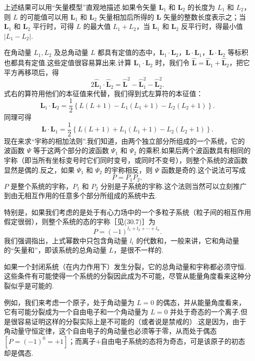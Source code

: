 上述结果可以用“矢量模型”直观地描述.如果令矢量 $\boldsymbol{L}_1$ 和 $\boldsymbol{L}_2$ 的长度为 $L_1$ 和 $L_2$，则 $L$ 的可能值可以用 $\boldsymbol{L}_1$ 和 $\boldsymbol{L}_2$ 矢量相加后所得的 $\boldsymbol{L}$ 矢量的整数长度表示之；当 $\boldsymbol{L}_1$ 和 $\boldsymbol{L}_2$ 平行时，可得 $L$ 的最大值 $L_1+L_2$，当 $\boldsymbol{L}_1$ 和 $\boldsymbol{L}_2$ 反平行时，得最小值 $|L_1-L_2|$.

在角动量 $L_1,L_2$ 及总角动量 $L$ 都具有定值的态中，$\boldsymbol{L}_1\cdot\boldsymbol{L}_2$，$\boldsymbol{L}\cdot\boldsymbol{L}_1$，$\boldsymbol{L}\cdot\boldsymbol{L}_2$ 等标积也都具有定值.这些定值很容易算出来.计算 $\boldsymbol{L}_1\cdot\boldsymbol{L}_2$ 时，我们令 $\hat{\boldsymbol{L}}=\hat{\boldsymbol{L}}_1+\hat{\boldsymbol{L}}_2$，把它平方再移项后，得
\begin{equation*}
  2\hat{\boldsymbol{L}}_1\cdot\hat{\boldsymbol{L}}_2
  =\hat{\boldsymbol{L}}^2-\hat{\boldsymbol{L}}_1^2-\hat{\boldsymbol{L}}_2^2.
\end{equation*}
式右的算符用他们的本征值来代替，我们得到式左算符的本征值：
\begin{equation}
  \boldsymbol{L}_1\cdot\boldsymbol{L}_2
  =\frac{1}{2}\left\{L(L+1)-L_1(L_1+1)-L_2(L_2+1)\right\}.
\end{equation}
同理可得
\begin{equation}
  \boldsymbol{L}\cdot\boldsymbol{L}_1
  =\frac{1}{2}\left\{L(L+1)+L_1(L_1+1)-L_2(L_2+1)\right\}.
\end{equation}
现在来求“宇称的相加法则”.我们知道，由两个独立部分所组成的一个系统，它的波函数 $\varPsi$ 等于这两个部分的波函数 $\varPsi_1$ 和 $\varPsi_2$ 的乘积.如果后两个波函数具有相同的宇称（即当所有坐标变号时它们同时变号，或同时不变号），则整个系统的波函数显然是偶的.反之，如果 $\varPsi_1$ 和 $\varPsi_2$ 的宇称相反，则 $\varPsi$ 函数是奇的.这个说法可写成
\begin{equation}
  P=P_1P_2,
\end{equation}
$P$ 是整个系统的宇称，$P_1$ 和 $P_2$ 分别是子系统的宇称.这个法则当然可以立刻推广到由无相互作用的任意多个部分所组成的系统中去.

特别是，如果我们考虑的是处于有心力场中的一个多粒子系统（粒子间的相互作用假定很弱），则整个系统的态的宇称［见(30.7)］为
\begin{equation}
  P=(-1)^{l_1+l_2+\cdots+l_n}.
\end{equation}
我们强调指出，上式幂数中只包含角动量 $l_i$ 的代数和，一般来讲，它和角动量的“矢量和”，即该系统的总角动量 $L$，是很不一样的.

如果一个封闭系统（在内力作用下）发生分裂，它的总角动量和宇称都必须守恒.这些条件有可能使得一个系统的分裂因此成为不可能，尽管从能量角度看来这种分裂似乎是可能的.

例如，我们来考虑一个原子，处于角动量为 $L=0$ 的偶态，并从能量角度看来，它有可能分裂成为一个自由电子和一个角动量为 $L=0$ 并处于奇态的一个离子.但是很容易证明这样的分裂实际上是不可能的（或者说是禁戒的）.这是因为，由于角动量守恒定律，这个自由电子的角动量也必须等于零，从而处于偶态 $[P=(-1)^0=+1]$；而离子$+$自由电子系统的态将为奇态，可是该原子的初态却是偶态.
